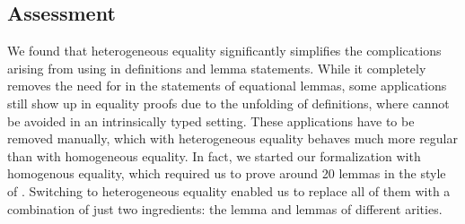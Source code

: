 \documentclass[acmsmall,anonymous,review,screen]{acmart}
\begin{document}
\subsection{Assessment}
\label{sec:assessment}
We found that heterogeneous equality significantly simplifies the complications arising from
using {\Asubst} in definitions and lemma statements. While it completely removes the need for
{\Asubst} in the statements of equational lemmas, some {\Asubst}
applications still show up in equality proofs due to the unfolding of definitions, where {\Asubst}
cannot be avoided in an intrinsically typed setting.
These {\Asubst} applications have to be removed manually, which with heterogeneous
equality behaves much more regular than with homogeneous equality. In
fact, we started our formalization with homogenous equality,
which required us to prove around 20 lemmas in the style of
. Switching to heterogeneous equality enabled us to
replace all of them with a combination of just two ingredients: the {}
lemma and {} lemmas of different arities.












\end{document}
